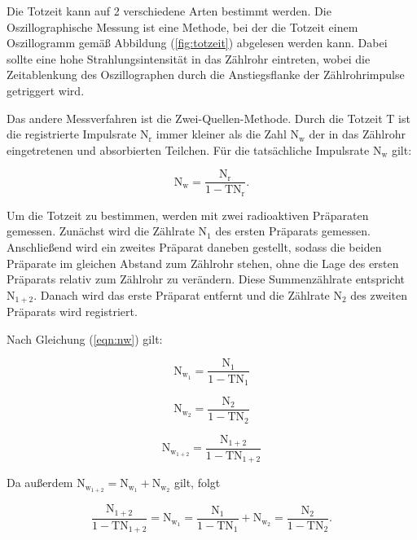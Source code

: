 \noindent
Die Totzeit kann auf 2 verschiedene Arten bestimmt werden.
Die Oszillographische Messung ist eine Methode, bei der die Totzeit einem Oszillogramm gemäß Abbildung (\ref{fig:totzeit}) abgelesen werden kann.
Dabei sollte eine hohe Strahlungsintensität in das Zählrohr eintreten, 
wobei die Zeitablenkung des Oszillographen durch die Anstiegsflanke der Zählrohrimpulse getriggert wird.

\noindent
Das andere Messverfahren ist die Zwei-Quellen-Methode.
Durch die Totzeit T ist die registrierte Impulsrate $\text{N}_\text{r}$ immer kleiner als die Zahl $\text{N}_\text{w}$ der in das Zählrohr eingetretenen und absorbierten Teilchen.
Für die tatsächliche Impulsrate $\text{N}_\text{w}$ gilt:

\begin{equation}
\text{N}_\text{w}=\frac{\text{N}_\text{r}}{1-\text{T}\text{N}_\text{r}}.
\label{eqn:nw}
\end{equation}

\noindent
Um die Totzeit zu bestimmen, werden mit zwei radioaktiven Präparaten gemessen.
Zunächst wird die Zählrate $\text{N}_1$ des ersten Präparats gemessen.
Anschließend wird ein zweites Präparat daneben gestellt, sodass die beiden Präparate im gleichen Abstand zum Zählrohr stehen, 
ohne die Lage des ersten Präparats relativ zum Zählrohr zu verändern.
Diese Summenzählrate entspricht $\text{N}_{1+2}$.
Danach wird das erste Präparat entfernt und die Zählrate $\text{N}_2$ des zweiten Präparats wird registriert.

\noindent
Nach Gleichung (\ref{eqn:nw}) gilt:

\begin{equation*}
\text{N}_{\text{w}_1}=\frac{\text{N}_1}{1-\text{T}\text{N}_1}
\end{equation*}

\begin{equation*}
\text{N}_{\text{w}_2}=\frac{\text{N}_2}{1-\text{T}\text{N}_2}
\end{equation*}

\begin{equation*}
\text{N}_{\text{w}_{1+2}}=\frac{\text{N}_{1+2}}{1-\text{T}\text{N}_{1+2}}
\end{equation*}

\noindent
Da außerdem $\text{N}_{\text{w}_{1+2}}=\text{N}_{\text{w}_1}+\text{N}_{\text{w}_2}$ gilt, folgt

\begin{equation}
\frac{\text{N}_{1+2}}{1-\text{T}\text{N}_{1+2}}=\text{N}_{\text{w}_1}=\frac{\text{N}_1}{1-\text{T}\text{N}_1}+\text{N}_{\text{w}_2}=\frac{\text{N}_2}{1-\text{T}\text{N}_2}.
\label{eqn:nw12}
\end{equation}

